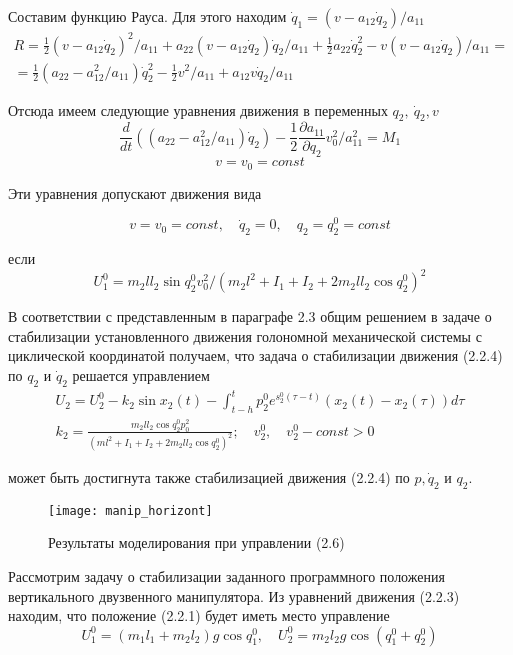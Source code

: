 Составим функцию Рауса. Для этого находим $\dot q_1 = (v - a_12 \dot q_2) / a_{11}$
$$
\begin{array}{c}
\displaystyle R = \frac12 (v - a_{12} \dot q_2)^2 / a_{11} + a_{22} (v - a_{12} \dot q_2) \dot q_2 / a_{11} + \frac12 a_{22} \dot q_2^2 - v (v - a_{12} \dot q_2) / a_{11} =\\
\displaystyle = \frac12 (a_{22} - a_{12}^2 / a_{11}) \dot q_2^2 - \frac12 v^2 / a_{11} + a_{12} v \dot q_2 / a_{11}
\end{array}
$$

Отсюда имеем следующие уравнения движения в переменных $q_2, \ \dot q_2, v$
$$\frac{d}{dt} ((a_{22} - a_{12}^2 / a_{11}) \dot q_2) - \frac12 \frac{\partial a_{11}}{\partial q_2} v_0^2 / a_{11}^2 = M_1$$
$$v = v_0 = const$$

Эти уравнения допускают движения вида 

\begin{equation}
v = v_0 = const, \quad \dot q_2 = 0, \quad q_2 = q_2^0 = const
\end{equation}

если 
$$U_1^0 = m_2 l l_2 \sin q_2^0 v_0^2 / (m_2 l^2 + I_1 + I_2 + 2 m_2 l l_2 \cos q_2^0)^2$$

В соответствии с представленным в параграфе 2.3 общим решением в задаче о стабилизации установленного движения голономной механической системы с циклической координатой получаем, что задача о стабилизации движения (2.2.4) по $q_2$ и $\dot q_2$ решается управлением
$$
\begin{array}{c}
\displaystyle U_2 = U_2^0 - k_2 \sin x_2 (t) - \int_{t-h}^{t} p_2^0 e^{s_2^0 (\tau - t)} (x_2 (t) - x_2 (\tau)) d \tau\\
\displaystyle k_2 = \frac{m_2 l l_2 \cos q_2^0 p_0^2}{(m l^2 + I_1 + I_2 + 2 m_2 l l_2 \cos q_2^0)^2}; \quad v_2^0, \quad v_2^0 - const > 0
\end{array}
$$

может быть достигнута также стабилизацией движения (2.2.4) по $p, \dot q_2$ и $q_2.$

\begin{figure}[h]
	\centering
	\texttt{[image: manip\_horizont]}
	\caption{Результаты моделирования при управлении (2.6)}
	\label{fig:manip_horizont}
\end{figure}

Рассмотрим задачу о стабилизации заданного программного положения вертикального двузвенного манипулятора. Из уравнений движения (2.2.3) находим, что положение (2.2.1) будет иметь место управление $$U_1^0 = (m_1 l_1 + m_2 l_2) g \cos q_1^0, \quad U_2^0 = m_2 l_2 g \cos (q_1^0 + q_2^0)$$

